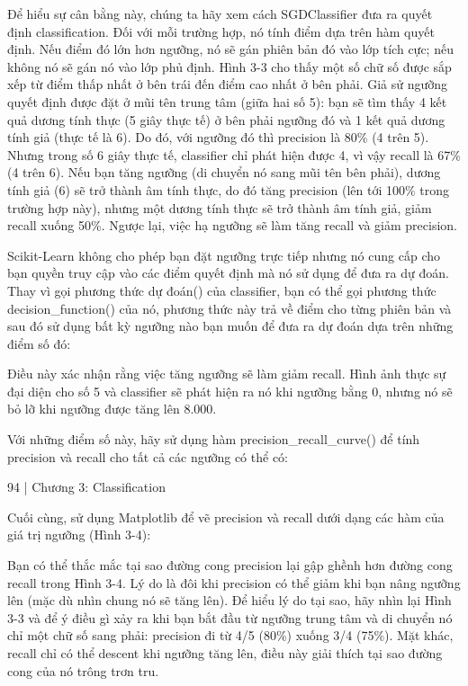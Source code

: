 Để hiểu sự cân bằng này, chúng ta hãy xem cách SGDClassifier đưa ra quyết định classification. Đối với mỗi trường hợp, nó tính điểm dựa trên hàm quyết định. Nếu điểm đó lớn hơn ngưỡng, nó sẽ gán phiên bản đó vào lớp tích cực; nếu không nó sẽ gán nó vào lớp phủ định. Hình 3-3 cho thấy một số chữ số được sắp xếp từ điểm thấp nhất ở bên trái đến điểm cao nhất ở bên phải. Giả sử ngưỡng quyết định được đặt ở mũi tên trung tâm (giữa hai số 5): bạn sẽ tìm thấy 4 kết quả dương tính thực (5 giây thực tế) ở bên phải ngưỡng đó và 1 kết quả dương tính giả (thực tế là 6). Do đó, với ngưỡng đó thì precision là 80\% (4 trên 5). Nhưng trong số 6 giây thực tế, classifier chỉ phát hiện được 4, vì vậy recall là 67\% (4 trên 6). Nếu bạn tăng ngưỡng (di chuyển nó sang mũi tên bên phải), dương tính giả (6) sẽ trở thành âm tính thực, do đó tăng precision (lên tới 100\% trong trường hợp này), nhưng một dương tính thực sẽ trở thành âm tính giả, giảm recall xuống 50\%. Ngược lại, việc hạ ngưỡng sẽ làm tăng recall và giảm precision.

Scikit-Learn không cho phép bạn đặt ngưỡng trực tiếp nhưng nó cung cấp cho bạn quyền truy cập vào các điểm quyết định mà nó sử dụng để đưa ra dự đoán. Thay vì gọi phương thức dự đoán() của classifier, bạn có thể gọi phương thức decision\_function() của nó, phương thức này trả về điểm cho từng phiên bản và sau đó sử dụng bất kỳ ngưỡng nào bạn muốn để đưa ra dự đoán dựa trên những điểm số đó:

Điều này xác nhận rằng việc tăng ngưỡng sẽ làm giảm recall. Hình ảnh thực sự đại diện cho số 5 và classifier sẽ phát hiện ra nó khi ngưỡng bằng 0, nhưng nó sẽ bỏ lỡ khi ngưỡng được tăng lên 8.000.

Với những điểm số này, hãy sử dụng hàm precision\_recall\_curve() để tính precision và recall cho tất cả các ngưỡng có thể có:

94 | Chương 3: Classification

Cuối cùng, sử dụng Matplotlib để vẽ precision và recall dưới dạng các hàm của giá trị ngưỡng (Hình 3-4):

Bạn có thể thắc mắc tại sao đường cong precision lại gập ghềnh hơn đường cong recall trong Hình 3-4. Lý do là đôi khi precision có thể giảm khi bạn nâng ngưỡng lên (mặc dù nhìn chung nó sẽ tăng lên). Để hiểu lý do tại sao, hãy nhìn lại Hình 3-3 và để ý điều gì xảy ra khi bạn bắt đầu từ ngưỡng trung tâm và di chuyển nó chỉ một chữ số sang phải: precision đi từ 4/5 (80\%) xuống 3/4 (75\%). Mặt khác, recall chỉ có thể descent khi ngưỡng tăng lên, điều này giải thích tại sao đường cong của nó trông trơn tru.

